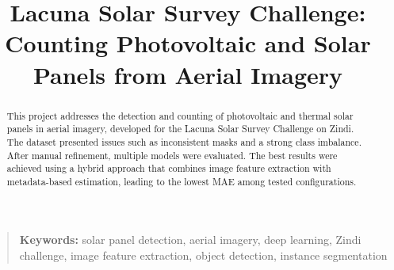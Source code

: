 \documentclass[conference]{IEEEtran}
\begin{document}
\title{Lacuna Solar Survey Challenge: Counting Photovoltaic and Solar Panels from Aerial Imagery}

\author{
\and
{}
}

\maketitle
\thispagestyle{plain}

\begin{abstract}
This project addresses the detection and counting of photovoltaic and thermal solar panels in aerial imagery, developed for the Lacuna Solar Survey Challenge on Zindi. The dataset presented issues such as inconsistent masks and a strong class imbalance. After manual refinement, multiple models were evaluated. The best results were achieved using a hybrid approach that combines image feature extraction with metadata-based estimation, leading to the lowest MAE among tested configurations.
\end{abstract}

\begin{quote}
\small
\noindent
\textbf{Keywords:} solar panel detection, aerial imagery, deep learning, Zindi challenge, image feature extraction, object detection, instance segmentation
\end{quote}

\IEEEpeerreviewmaketitle
\end{document}
